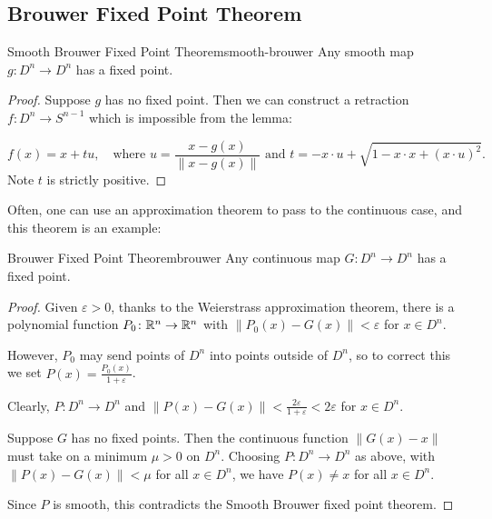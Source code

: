 \subsection{Brouwer Fixed Point Theorem}

\begin{theorem}{Smooth Brouwer Fixed Point Theorem}{smooth-brouwer}
    Any smooth map $g \colon D^n \to D^n$ has a fixed point.
\end{theorem}

\begin{proof}
    Suppose $g$ has no fixed point. Then we can construct a retraction $f \colon D^n \to S^{n-1}$ which is impossible from the lemma:
    \begin{center}
    \end{center}
    \[
        f(x) = x + tu, \quad \text{where } u = \frac{x - g(x)}{\|x - g(x)\|} \text{ and } t = -x \cdot u + \sqrt{1 - x \cdot x + (x \cdot u)^2}.
    \]
    Note $t$ is strictly positive.
\end{proof}

Often, one can use an approximation theorem to pass to the continuous case, and this theorem is an example:

\begin{theorem}{Brouwer Fixed Point Theorem}{brouwer}
    Any continuous map $G \colon D^n \to D^n$ has a fixed point.
\end{theorem}

\begin{proof}
    Given $\varepsilon > 0$, thanks to the Weierstrass approximation theorem, there is a polynomial function $P_0 \colon \mathbb{R}^n \to \mathbb{R}^n$ with $\|P_0(x) - G(x)\| < \varepsilon$ for $x \in D^n$.

    However, $P_0$ may send points of $D^n$ into points outside of $D^n$, so to correct this we set $P(x) = \frac{P_0(x)}{1 + \varepsilon}$.

    Clearly, $P \colon D^n \to D^n$ and $\|P(x) - G(x)\| < \frac{2\varepsilon}{1+\varepsilon} < 2\varepsilon$ for $x \in D^n$.

    Suppose $G$ has no fixed points. Then the continuous function $\|G(x) - x\|$ must take on a minimum $\mu > 0$ on $D^n$. Choosing $P \colon D^n \to D^n$ as above, with $\|P(x) - G(x)\| < \mu$ for all $x \in D^n$, we have $P(x) \neq x$ for all $x \in D^n$.

    Since $P$ is smooth, this contradicts the Smooth Brouwer fixed point theorem.
\end{proof}

